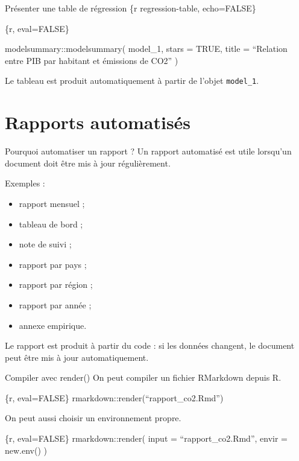 \documentclass[
  10pt,
  ignorenonframetext,
]{beamer}
\providecommand{\tightlist}{%
  \setlength{\itemsep}{0pt}\setlength{\parskip}{0pt}}
\begin{document}
\begin{frame}[fragile]{Présenter une table de régression}
\label{pruxe9senter-une-table-de-ruxe9gression}
\{r regression-table, echo=FALSE\}

\{r, eval=FALSE\}

modelsummary::modelsummary( model\_1, stars = TRUE, title = ``Relation
entre PIB par habitant et émissions de CO2'' )

Le tableau est produit automatiquement à partir de l'objet
\texttt{model\_1}.
\end{frame}

\section{Rapports automatisés}\label{rapports-automatisuxe9s}

\begin{frame}{Pourquoi automatiser un rapport ?}
\label{pourquoi-automatiser-un-rapport}
Un rapport automatisé est utile lorsqu'un document doit être mis à jour
régulièrement.

Exemples :

\begin{itemize}
\tightlist
\item
  rapport mensuel ;
\item
  tableau de bord ;
\item
  note de suivi ;
\item
  rapport par pays ;
\item
  rapport par région ;
\item
  rapport par année ;
\item
  annexe empirique.
\end{itemize}

Le rapport est produit à partir du code : si les données changent, le
document peut être mis à jour automatiquement.
\end{frame}

\begin{frame}{Compiler avec render()}
\label{compiler-avec-render}
On peut compiler un fichier RMarkdown depuis R.

\{r, eval=FALSE\} rmarkdown::render(``rapport\_co2.Rmd'')

On peut aussi choisir un environnement propre.

\{r, eval=FALSE\} rmarkdown::render( input = ``rapport\_co2.Rmd'', envir
= new.env() )
\end{frame}
\end{document}
